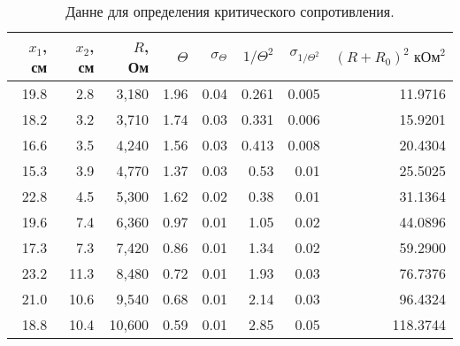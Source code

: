 \begin{table} 
\begin{center}
 \caption{Данне для определения критического сопротивления.}
 \label{table2}
\begin{tabular}{|*{8}{r|}}
\hline 
 $x_1$, см  & $x_2$, см & $R$, Ом & $\Theta$ & $\sigma_\Theta$ & $1 / \Theta^2$ & $\sigma_{1 / \Theta^2}$ & $(R + R_0)^2 \text{ кОм}^2$\\ \hline 
 19.8 & 2.8 & 3,180 & 1.96 & 0.04 & 0.261 & 0.005 & 11.9716 \\ \hline 
 18.2 & 3.2 & 3,710 & 1.74 & 0.03 & 0.331 & 0.006 & 15.9201 \\ \hline 
 16.6 & 3.5 & 4,240 & 1.56 & 0.03 & 0.413 & 0.008 & 20.4304 \\ \hline 
 15.3 & 3.9 & 4,770 & 1.37 & 0.03 & 0.53 & 0.01 & 25.5025 \\ \hline 
 22.8 & 4.5 & 5,300 & 1.62 & 0.02 & 0.38 & 0.01 & 31.1364 \\ \hline 
 19.6 & 7.4 & 6,360 & 0.97 & 0.01 & 1.05 & 0.02 & 44.0896 \\ \hline 
 17.3 & 7.3 & 7,420 & 0.86 & 0.01 & 1.34 & 0.02 & 59.2900 \\ \hline 
 23.2 & 11.3 & 8,480 & 0.72 & 0.01 & 1.93 & 0.03 & 76.7376 \\ \hline 
 21.0 & 10.6 & 9,540 & 0.68 & 0.01 & 2.14 & 0.03 & 96.4324 \\ \hline 
 18.8 & 10.4 & 10,600 & 0.59 & 0.01 & 2.85 & 0.05 & 118.3744 \\ \hline 
 \end{tabular} 
 \end{center}
\end{table} 
